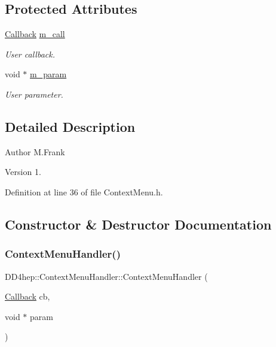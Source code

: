 \subsection*{Protected Attributes}
\begin{DoxyCompactItemize}
\item 
\hyperlink{class_d_d4hep_1_1_callback}{Callback} \hyperlink{class_d_d4hep_1_1_context_menu_handler_a28f1c56b0623ef052bb8647004acc5a7}{m\+\_\+call}
\begin{DoxyCompactList}\small\item\em User callback. \end{DoxyCompactList}\item 
void $\ast$ \hyperlink{class_d_d4hep_1_1_context_menu_handler_a87e20729498769077b9fb5a668fdf410}{m\+\_\+param}
\begin{DoxyCompactList}\small\item\em User parameter. \end{DoxyCompactList}\end{DoxyCompactItemize}


\subsection{Detailed Description}
\begin{DoxyAuthor}{Author}
M.\+Frank 
\end{DoxyAuthor}
\begin{DoxyVersion}{Version}
1. 
\end{DoxyVersion}


Definition at line 36 of file Context\+Menu.\+h.



\subsection{Constructor \& Destructor Documentation}
\hypertarget{class_d_d4hep_1_1_context_menu_handler_a55e7ee588a28189cb0766e1399d6b0c0}{}\label{class_d_d4hep_1_1_context_menu_handler_a55e7ee588a28189cb0766e1399d6b0c0} 
\subsubsection{\texorpdfstring{Context\+Menu\+Handler()}{ContextMenuHandler()}}
{\footnotesize\ttfamily D\+D4hep\+::\+Context\+Menu\+Handler\+::\+Context\+Menu\+Handler (\begin{DoxyParamCaption}\item[{\hyperlink{class_d_d4hep_1_1_callback}{Callback}}]{cb,  }\item[{void $\ast$}]{param }\end{DoxyParamCaption})}



